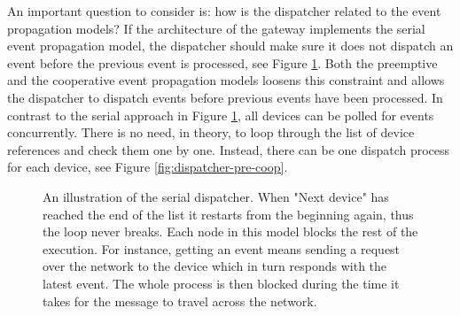 An important question to consider is: how is the dispatcher related to the
event propagation models? If the architecture of the gateway implements the
serial event propagation model, the dispatcher should make sure it does not
dispatch an event before the previous event is processed, see Figure
\ref{fig:dispatcher-serial}. Both the preemptive and the cooperative event
propagation models loosens this constraint and allows the dispatcher to
dispatch events before previous events have been processed. In contrast to the
serial approach in Figure \ref{fig:dispatcher-serial}, all devices can be
polled for events concurrently. There is no need, in theory, to loop through
the list of device references and check them one by one. Instead, there can be
one dispatch process for each device, see Figure \ref{fig:dispatcher-pre-coop}.

\begin{figure}[h!]
    \centering

    \caption{An illustration of the serial dispatcher. When "Next device" has
    reached the end of the list it restarts from the beginning again, thus the
    loop never breaks. Each node in this model blocks the rest of the
    execution. For instance, getting an event means sending a request over the
    network to the device which in turn responds with the latest event. The
    whole process is then blocked during the time it takes for the message to
    travel across the network.}

    \label{fig:dispatcher-serial}
\end{figure}

